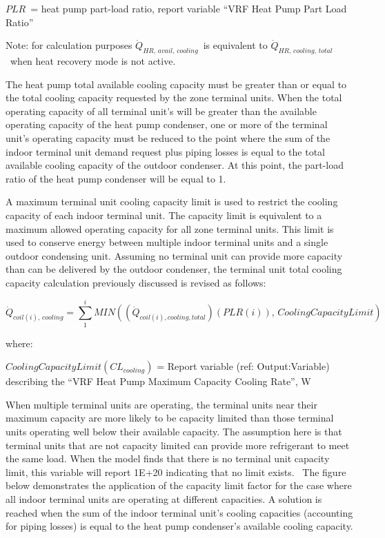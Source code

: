 \(PLR\) = heat pump part-load ratio, report variable ``VRF Heat Pump Part Load Ratio''

Note: for calculation purposes \(\dot{Q}_{HR,\,avail,\,cooling}\) is equivalent to \(\dot{Q}_{HR,\,cooling,\,total}\) when heat recovery mode is not active.

The heat pump total available cooling capacity must be greater than or equal to the total cooling capacity requested by the zone terminal units. When the total operating capacity of all terminal unit's will be greater than the available operating capacity of the heat pump condenser, one or more of the terminal unit's operating capacity must be reduced to the point where the sum of the indoor terminal unit demand request plus piping losses is equal to the total available cooling capacity of the outdoor condenser. At this point, the part-load ratio of the heat pump condenser will be equal to 1.

A maximum terminal unit cooling capacity limit is used to restrict the cooling capacity of each indoor terminal unit. The capacity limit is equivalent to a maximum allowed operating capacity for all zone terminal units. This limit is used to conserve energy between multiple indoor terminal units and a single outdoor condensing unit. Assuming no terminal unit can provide more capacity than can be delivered by the outdoor condenser, the terminal unit total cooling capacity calculation previously discussed is revised as follows:

\begin{equation}
  \dot{Q}_{coil(i),\,cooling} = \sum\limits_1^i MIN \left( \left( \dot{Q}_{coil(i),cooling,total} \right) \left( PLR(i) \right),\,CoolingCapacityLimit \right)
\end{equation}

where:

\(CoolingCapacityLimit(CL_{cooling})\) = Report variable (ref: Output:Variable) describing the ``VRF Heat Pump Maximum Capacity Cooling Rate'', W

When multiple terminal units are operating, the terminal units near their maximum capacity are more likely to be capacity limited than those terminal units operating well below their available capacity. The assumption here is that terminal units that are not capacity limited can provide more refrigerant to meet the same load. When the model finds that there is no terminal unit capacity limit, this variable will report 1E+20 indicating that no limit exists.  The figure below demonstrates the application of the capacity limit factor for the case where all indoor terminal units are operating at different capacities. A solution is reached when the sum of the indoor terminal unit's cooling capacities (accounting for piping losses) is equal to the heat pump condenser's available cooling capacity.

